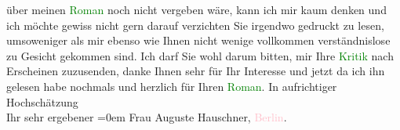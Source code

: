                über meinen \textcolor{green}{Roman}{} noch nicht
               vergeben wäre, kann ich mir kaum denken und ich möchte gewiss nicht gern darauf
               verzichten Sie irgendwo gedruckt zu lesen, umsoweniger als mir ebenso wie Ihnen nicht
               wenige vollkommen verständnislose zu Gesicht gekommen sind. Ich darf Sie wohl darum
               bitten, mir Ihre \textcolor{green}{Kritik}{} nach
               Erscheinen zuzusenden, danke Ihnen sehr für Ihr Interesse und jetzt da ich ihn
               gelesen habe {\pb}nochmals und herzlich für Ihren \textcolor{green}{Roman}{}.\pend
           \pstart
           In aufrichtiger Hochschätzung{\\[\baselineskip]}Ihr sehr ergebener\pend
           \leftskip=0em{}{\bigskip}\pstart
           \noindent{}Frau Auguste Hauschner, \textcolor{pink}{Berlin}{}\ledrightnote{\textcolor{pink}{Berlin}}.\pend
           \endnumbering{}  
      